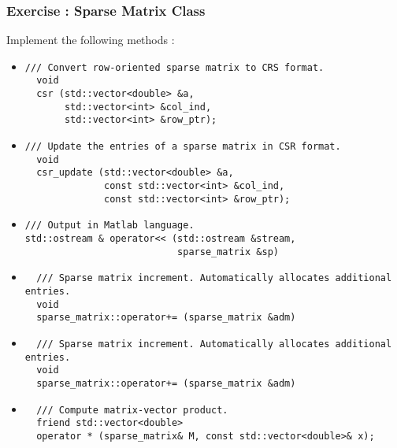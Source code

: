 \documentclass{beamer}
\begin{document}
\begin{frame}[fragile]
\frametitle{Exercise : Sparse Matrix Class}
\tiny Implement the following methods :
\begin{itemize}

\item 
\tiny\begin{lstlisting}
/// Convert row-oriented sparse matrix to CRS format.
  void
  csr (std::vector<double> &a,
       std::vector<int> &col_ind,
       std::vector<int> &row_ptr);
\end{lstlisting} \normalsize

\item 
\tiny\begin{lstlisting}
/// Update the entries of a sparse matrix in CSR format.
  void
  csr_update (std::vector<double> &a,
              const std::vector<int> &col_ind,
              const std::vector<int> &row_ptr);
\end{lstlisting} \normalsize

\item 
\tiny\begin{lstlisting}
/// Output in Matlab language.
std::ostream & operator<< (std::ostream &stream,
                           sparse_matrix &sp)
\end{lstlisting} \normalsize

\item 
\tiny\begin{lstlisting}
  /// Sparse matrix increment. Automatically allocates additional entries.
  void 
  sparse_matrix::operator+= (sparse_matrix &adm)
\end{lstlisting} \normalsize

\item 
\tiny\begin{lstlisting}
  /// Sparse matrix increment. Automatically allocates additional entries.
  void 
  sparse_matrix::operator+= (sparse_matrix &adm)
\end{lstlisting} \normalsize

\item 
\tiny\begin{lstlisting}
  /// Compute matrix-vector product.
  friend std::vector<double>
  operator * (sparse_matrix& M, const std::vector<double>& x);
\end{lstlisting} \normalsize

\end{itemize}
\end{frame}
\end{document}
